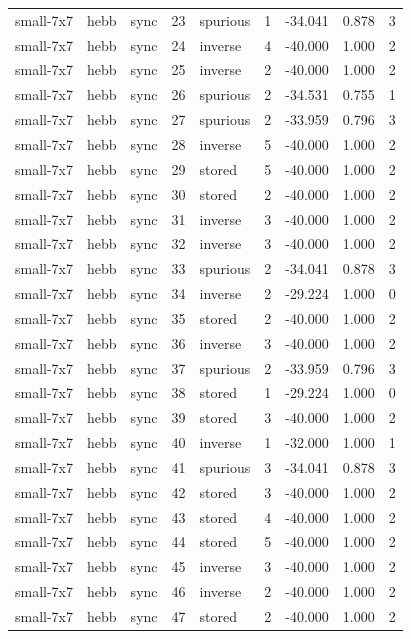 \begin{tabular}{lllrlrrrr}
small-7x7 & hebb & sync & 23 & spurious & 1 & -34.041 & 0.878 & 3 \\
small-7x7 & hebb & sync & 24 & inverse & 4 & -40.000 & 1.000 & 2 \\
small-7x7 & hebb & sync & 25 & inverse & 2 & -40.000 & 1.000 & 2 \\
small-7x7 & hebb & sync & 26 & spurious & 2 & -34.531 & 0.755 & 1 \\
small-7x7 & hebb & sync & 27 & spurious & 2 & -33.959 & 0.796 & 3 \\
small-7x7 & hebb & sync & 28 & inverse & 5 & -40.000 & 1.000 & 2 \\
small-7x7 & hebb & sync & 29 & stored & 5 & -40.000 & 1.000 & 2 \\
small-7x7 & hebb & sync & 30 & stored & 2 & -40.000 & 1.000 & 2 \\
small-7x7 & hebb & sync & 31 & inverse & 3 & -40.000 & 1.000 & 2 \\
small-7x7 & hebb & sync & 32 & inverse & 3 & -40.000 & 1.000 & 2 \\
small-7x7 & hebb & sync & 33 & spurious & 2 & -34.041 & 0.878 & 3 \\
small-7x7 & hebb & sync & 34 & inverse & 2 & -29.224 & 1.000 & 0 \\
small-7x7 & hebb & sync & 35 & stored & 2 & -40.000 & 1.000 & 2 \\
small-7x7 & hebb & sync & 36 & inverse & 3 & -40.000 & 1.000 & 2 \\
small-7x7 & hebb & sync & 37 & spurious & 2 & -33.959 & 0.796 & 3 \\
small-7x7 & hebb & sync & 38 & stored & 1 & -29.224 & 1.000 & 0 \\
small-7x7 & hebb & sync & 39 & stored & 3 & -40.000 & 1.000 & 2 \\
small-7x7 & hebb & sync & 40 & inverse & 1 & -32.000 & 1.000 & 1 \\
small-7x7 & hebb & sync & 41 & spurious & 3 & -34.041 & 0.878 & 3 \\
small-7x7 & hebb & sync & 42 & stored & 3 & -40.000 & 1.000 & 2 \\
small-7x7 & hebb & sync & 43 & stored & 4 & -40.000 & 1.000 & 2 \\
small-7x7 & hebb & sync & 44 & stored & 5 & -40.000 & 1.000 & 2 \\
small-7x7 & hebb & sync & 45 & inverse & 3 & -40.000 & 1.000 & 2 \\
small-7x7 & hebb & sync & 46 & inverse & 2 & -40.000 & 1.000 & 2 \\
small-7x7 & hebb & sync & 47 & stored & 2 & -40.000 & 1.000 & 2 \\

\end{tabular}
